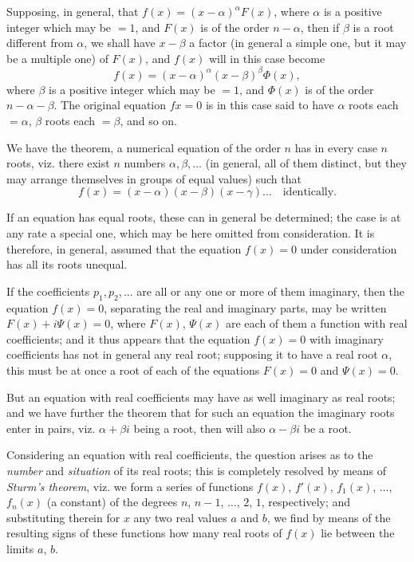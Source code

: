\documentclass[11pt,a4paper]{book}
\begin{document}
Supposing, in general, that $f(x) = (x-\alpha)^\alpha F(x)$, where $\alpha$ is a positive integer which may be $=1$, and $F(x)$ is of the order $n-\alpha$, then if $\beta$ is a root different from $\alpha$, we shall have $x - \beta$ a factor (in general a simple one, but it may be a multiple one) of $F(x)$, and $f(x)$ will in this case become
\[
f(x) = (x-\alpha)^\alpha (x-\beta)^\beta \Phi(x),
\]
where $\beta$ is a positive integer which may be $=1$, and $\Phi(x)$ is of the order $n - \alpha - \beta$. The original equation $fx = 0$ is in this case said to have $\alpha$ roots each $= \alpha$, $\beta$ roots each $= \beta$, and so on.

We have the theorem, a numerical equation of the order $n$ has in every case $n$ roots, viz. there exist $n$ numbers $\alpha, \beta, \ldots$ (in general, all of them distinct, but they may arrange themselves in groups of equal values) such that
\[
f(x) = (x-\alpha)(x-\beta)(x-\gamma)\ldots \quad \text{identically}.
\]

If an equation has equal roots, these can in general be determined; the case is at any rate a special one, which may be here omitted from consideration. It is therefore, in general, assumed that the equation $f(x) = 0$ under consideration has all its roots unequal.

If the coefficients $p_1, p_2, \ldots$ are all or any one or more of them imaginary, then the equation $f(x) = 0$, separating the real and imaginary parts, may be written $F(x) + i\Psi(x) = 0$, where $F(x)$, $\Psi(x)$ are each of them a function with real coefficients; and it thus appears that the equation $f(x) = 0$ with imaginary coefficients has not in general any real root; supposing it to have a real root $\alpha$, this must be at once a root of each of the equations $F(x) = 0$ and $\Psi(x) = 0$.

But an equation with real coefficients may have as well imaginary as real roots; and we have further the theorem that for such an equation the imaginary roots enter in pairs, viz. $\alpha + \beta i$ being a root, then will also $\alpha - \beta i$ be a root.

Considering an equation with real coefficients, the question arises as to the \textit{number} and \textit{situation} of its real roots; this is completely resolved by means of \textit{Sturm's theorem}, viz. we form a series of functions $f(x)$, $f'(x)$, $f_1(x)$, $\ldots$, $f_n(x)$ (a constant) of the degrees $n$, $n-1$, $\ldots$, $2$, $1$, respectively; and substituting therein for $x$ any two real values $a$ and $b$, we find by means of the resulting signs of these functions how many real roots of $f(x)$ lie between the limits $a$, $b$.
\end{document}
